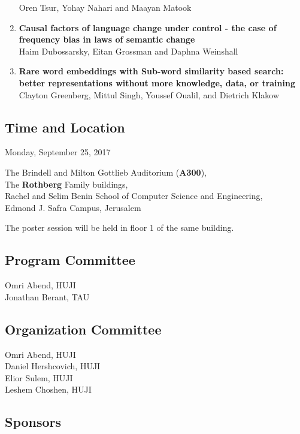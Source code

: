 \documentclass[a0,portrait]{a0poster}
\begin{document}
\begin{enumerate}
  Oren Tsur, Yohay Nahari and Maayan Matook
\item
  \textbf{Causal factors of language change under control - the case of
  frequency bias in laws of semantic change}\\
  Haim Dubossarsky, Eitan Grossman and Daphna Weinshall
\item
  \textbf{Rare word embeddings with Sub-word similarity based search:
  better representations without more knowledge, data, or training}\\
  Clayton Greenberg, Mittul Singh, Youssef Oualil, and Dietrich Klakow
\end{enumerate}

\subsection*{Time and Location}\label{time-and-location}

Monday, September 25, 2017

The Brindell and Milton Gottlieb Auditorium (\textbf{A300}),\\
The \textbf{Rothberg} Family buildings,\\
Rachel and Selim Benin School of Computer Science and Engineering,\\
Edmond J. Safra Campus, Jerusalem

The poster session will be held in floor 1 of the same building.

\subsection*{Program Committee}\label{program-committee}

Omri Abend, HUJI\\
Jonathan Berant, TAU

\subsection*{Organization Committee}\label{organization-committee}

Omri Abend, HUJI\\
Daniel Hershcovich, HUJI\\
Elior Sulem, HUJI\\
Leshem Choshen, HUJI

\subsection*{Sponsors}\label{sponsors}
\end{document}
